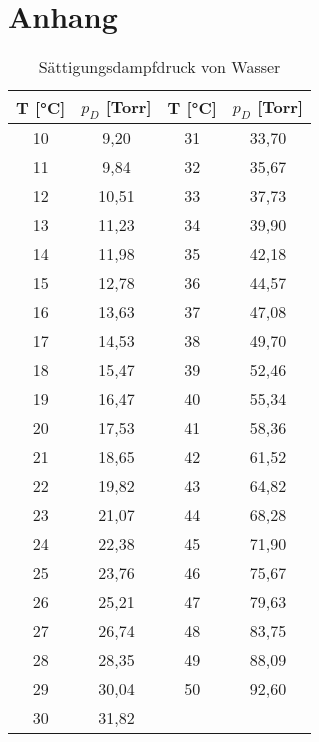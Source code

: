 \onecolumn
\chapter{Anhang}
\begin{table}[h!]
\centering
\begin{tabular}{c|c||c|c}
\hline
T [°C] & $p_D$ [Torr] & T [°C] & $p_D$ [Torr] \\
\hline
10 & 9,20  & 31 & 33,70 \\
11 & 9,84  & 32 & 35,67 \\
12 & 10,51 & 33 & 37,73 \\
13 & 11,23 & 34 & 39,90 \\
14 & 11,98 & 35 & 42,18 \\
15 & 12,78 & 36 & 44,57 \\
16 & 13,63 & 37 & 47,08 \\
17 & 14,53 & 38 & 49,70 \\
18 & 15,47 & 39 & 52,46 \\
19 & 16,47 & 40 & 55,34 \\
20 & 17,53 & 41 & 58,36 \\
21 & 18,65 & 42 & 61,52 \\
22 & 19,82 & 43 & 64,82 \\
23 & 21,07 & 44 & 68,28 \\
24 & 22,38 & 45 & 71,90 \\
25 & 23,76 & 46 & 75,67 \\
26 & 25,21 & 47 & 79,63 \\
27 & 26,74 & 48 & 83,75 \\
28 & 28,35 & 49 & 88,09 \\
29 & 30,04 & 50 & 92,60 \\
30 & 31,82 &    &       \\
\hline
\end{tabular}
\caption{Sättigungsdampfdruck von Wasser}
\end{table}
\twocolumn